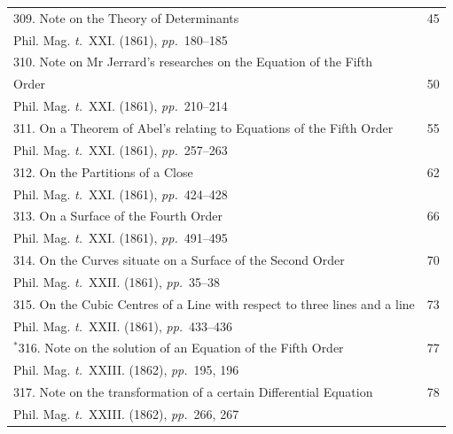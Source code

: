 \documentclass[11pt,a4paper]{article}
\newcommand{\tome}{\textit{t.}}
\newcommand{\pages}{\textit{pp.}}
\begin{document}
\clearpage

\begin{longtable}{p{4.8in}r}
309. Note on the Theory of Determinants & 45 \\[-0.3em]
\multicolumn{2}{l}{\quad\small Phil. Mag. \tome~XXI. (1861), \pages~180--185} \\[0.5em]

\multicolumn{2}{l}{310. Note on Mr Jerrard's researches on the Equation of the Fifth} \\[-0.3em]
\quad Order & 50 \\[-0.3em]
\multicolumn{2}{l}{\quad\small Phil. Mag. \tome~XXI. (1861), \pages~210--214} \\[0.5em]

311. On a Theorem of Abel's relating to Equations of the Fifth Order & 55 \\[-0.3em]
\multicolumn{2}{l}{\quad\small Phil. Mag. \tome~XXI. (1861), \pages~257--263} \\[0.5em]

312. On the Partitions of a Close & 62 \\[-0.3em]
\multicolumn{2}{l}{\quad\small Phil. Mag. \tome~XXI. (1861), \pages~424--428} \\[0.5em]

313. On a Surface of the Fourth Order & 66 \\[-0.3em]
\multicolumn{2}{l}{\quad\small Phil. Mag. \tome~XXI. (1861), \pages~491--495} \\[0.5em]

314. On the Curves situate on a Surface of the Second Order & 70 \\[-0.3em]
\multicolumn{2}{l}{\quad\small Phil. Mag. \tome~XXII. (1861), \pages~35--38} \\[0.5em]

315. On the Cubic Centres of a Line with respect to three lines and a line & 73 \\[-0.3em]
\multicolumn{2}{l}{\quad\small Phil. Mag. \tome~XXII. (1861), \pages~433--436} \\[0.5em]

$^*$316. Note on the solution of an Equation of the Fifth Order & 77 \\[-0.3em]
\multicolumn{2}{l}{\quad\small Phil. Mag. \tome~XXIII. (1862), \pages~195, 196} \\[0.5em]

317. Note on the transformation of a certain Differential Equation & 78 \\[-0.3em]
\multicolumn{2}{l}{\quad\small Phil. Mag. \tome~XXIII. (1862), \pages~266, 267} \\[0.5em]


\end{longtable}
\end{document}
